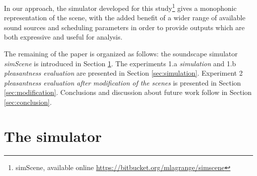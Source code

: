 \documentclass[12pt]{elsarticle}
\newcommand{\cf}{cf.}
\begin{document}
In our approach, the simulator developed for this study\footnote{simScene, available online \url{https://bitbucket.org/mlagrange/simscene}} gives a monophonic representation of the scene, with the added benefit of a wider range of available sound sources and scheduling parameters in order to provide outputs which are both expressive and useful for analysis.


The remaining of the paper is organized as follows: the soundscape simulator \emph{simScene} is introduced in Section \ref{sec:simulator}. The experiments  1.a \emph{simulation} and  1.b \emph{pleasantness evaluation} are presented in Section \ref{sec:simulation}. Experiment 2 \emph{pleasantness evaluation after modification of the scenes} is presented in Section \ref{sec:modification}. Conclusions and discussion about future work follow in Section \ref{sec:conclusion}.






\section{The simulator}
\label{sec:simulator}

\end{document}
